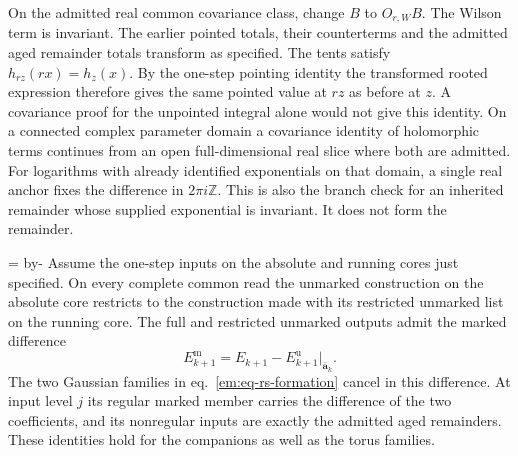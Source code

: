 \documentclass[11pt,letterpaper,reqno]{amsart}
\makeatletter
\numberwithin{equation}{section}
\renewcommand{\eqref}[1]{\textup{eq.~\ref{#1}}}
\newcommand{\emneedspace}[1]{\par\begingroup
  \dimen0=\pagegoal\advance\dimen0 by-\pagetotal
  \ifdim\dimen0<#1\relax\newpage\fi\endgroup}
\theoremstyle{definition}
\newcommand{\ms@minorstart}{%
  \pushQED{\qed}\renewcommand{\qedsymbol}{$\blacksquare$}}
\newenvironment{proposition}[1][]{\ms@minorstart\ms@proposition[#1]}
  {\popQED\endms@proposition}
\theoremstyle{remark}
\makeatother
\begin{document}
On the admitted real common covariance class, change $B$ to $O_{r,W}B$.
The Wilson term is invariant. The earlier pointed totals, their
counterterms and the admitted aged remainder totals transform as
specified. The tents satisfy $h_{rz}(rx)=h_z(x)$. By the one-step
pointing identity the transformed rooted expression therefore gives the
same pointed value at $rz$ as before at $z$. A covariance proof for the
unpointed integral alone would not give this identity. On a connected
complex parameter domain a covariance identity of holomorphic terms
continues from an open full-dimensional real slice where both are
admitted. For logarithms with already identified exponentials on that
domain, a single real anchor fixes the difference in $2\pi i\mathbb Z$.
This is also the branch check for an inherited remainder whose supplied
exponential is invariant. It does not form the remainder.

\emneedspace{12\baselineskip}
\begin{proposition}[Restriction of the same step]\label{em:prop-common-restriction}
Assume the one-step inputs on the absolute and running cores just
specified. On every complete common read the unmarked construction on
the absolute core restricts to the construction made with its restricted
unmarked list on the running core. The full and restricted unmarked
outputs admit the marked difference
\begin{equation}\label{em:eq-marked-difference}
 E_{k+1}^{\mathrm m}=E_{k+1}-E_{k+1}^{\mathrm u}|_{\bar{\mathbf a}_k}.
\end{equation}
The two Gaussian families in \eqref{em:eq-rs-formation} cancel in this
difference. At input level $j$ its regular marked member carries the
difference of the two coefficients, and its nonregular inputs are
exactly the admitted aged remainders. These identities hold for the
companions as well as the torus families.
\end{proposition}
\end{document}
